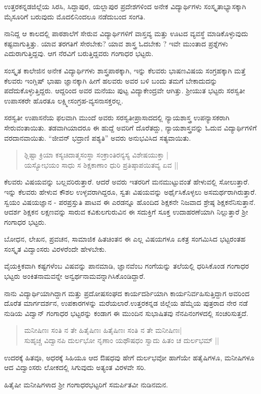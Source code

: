 ಉತ್ತರಕನ್ನಡಜಿಲ್ಲೆಯ ಸಿರಸಿ, ಸಿದ್ದಾಪುರ, ಯಲ್ಲಾಪುರ ಪ್ರದೇಶಗಳಿಂದ ಅನೇಕ ವಿದ್ಯಾರ್ಥಿಗಳು ಸಂಸ್ಕೃತಾಭ್ಯಾಸಕ್ಕಾಗಿ ಮೈಸೂರಿಗೆ ಬರುವುದು ಮೊದಲಿನಿಂದಲೂ ನಡೆದುಬಂದ ಸಂಗತಿ. 

ನಾನಿದ್ದ ಆ ಕಾಲದಲ್ಲಿ ಪಾಠಶಾಲೆಗೆ ಸೇರುವ ವಿದ್ಯಾರ್ಥಿಗಳಿಗೆ ವಾಸ್ತವ್ಯ ಮತ್ತು ಊಟದ ವ್ಯವಸ್ಥೆ ಮಾಡಿಕೊಳ್ಳುವುದು ಕಷ್ಟವಾಗುತ್ತಿತ್ತು. ಯಾವ ತರಗತಿಗೆ ಸೇರಬೇಕು? ಯಾವ ಶಾಸ್ತ್ರ ಓದಬೇಕು ? ಇವೇ ಮುಂತಾದ ಪ್ರಶ್ನೆಗಳು ಎದುರಾಗುತ್ತಿದ್ದವು. ಆಗ ನೆರವಿಗೆ ಬರುತ್ತಿದ್ದವರು ಗಂಗಾಧರ ಭಟ್ಟರು.

ಸಂಸ್ಕೃತ ಕಾಲೇಜಿನ ಅನೇಕ ವಿದ್ಯಾರ್ಥಿಗಳು ಶಾಸ್ತ್ರಪಾಠಕ್ಕಾಗಿ, ಇನ್ನು ಕೆಲವರು ಭಾಷಣವಿಷಯ ಸಂಗ್ರಹಕ್ಕಾಗಿ ಮತ್ತೆ ಕೆಲವರು ಇಂಗ್ಲಿಷ್ ಭಾಷಾ ಜ್ಞಾನಕ್ಕಾಗಿ ಹೀಗೆ ಹಲವರು ಅವರ ಬಳಿ ಬಂದು ತಮಗೆ ಬೇಕಾದುದನ್ನು ಪದೆದುಕೊಳ್ಳುತ್ತಿದ್ದರು. ಆದ್ದರಿಂದ ಅವರ ಮನೆಯು ಪುಟ್ಟ ವಿದ್ಯಾಕೇಂದ್ರವೇ ಆಗಿತ್ತು. ಶ್ರೀಯುತ ಭಟ್ಟರು ಸರಸ್ವತೀ ಉಪಾಸಕರೇ ಹೊರತೂ ಲಕ್ಷ್ಮೀಸಂಗ್ರಹ-ವ್ಯಸನಾಸಕ್ತರಲ್ಲ.

ಸರಸ್ವತೀ ಉಪಾಸನೆಯ ಫಲವಾಗಿ ಮುಂದೆ ಅವರು ಸರಸ್ವತೀಪ್ರಾಸಾದದಲ್ಲಿ ನ್ಯಾಯಶಾಸ್ತ್ರ ಉಪನ್ಯಾಸಕರಾಗಿ ಸೇರುವಂತಾಯಿತು. ತಡವಾಗಿಯಾದರೂ ಈ ಹುದ್ದೆ ಅವರಿಗೆ ದೊರೆತದ್ದು, ನ್ಯಾಯಶಾಸ್ತ್ರವನ್ನು ಓದುವ ವಿದ್ಯಾರ್ಥಿಗಳಿಗೆ ವರದಾನವಾಯಿತು. “ಜೀವನ್ ಭದ್ರಾಣಿ ಪಶ್ಯತಿ” ಅವರು ಅನುಭವಿಸಿದ ಸತ್ಯವಾಯಿತು.
\begin{verse}
ಶ್ಲಿಷ್ಟಾ ಕ್ರಿಯಾ ಕಸ್ಯಚಿದಾತ್ಮಸಂಸ್ಥಾ ಸಂಕ್ರಾಂತಿರನ್ಯಸ್ಯ ವಿಶೇಷಯುಕ್ತಾ |\\
ಯಸ್ಯೋಭಯಂ ಸಾಧು ಸ ಶಿಕ್ಷಕಾಣಾಂ ಧುರಿ ಪ್ರತಿಷ್ಠಾಪಯಿತವ್ಯ ಏವ ||
\end{verse}
ಕೆಲವರು ವಿಷಯವನ್ನು ಬಲ್ಲವರಿರುತ್ತಾರೆ. ಆದರೆ ಅವರು ಇತರರಿಗೆ ಮನಮುಟ್ಟುವಂತೆ ಹೇಳುವಲ್ಲಿ ಸೋಲುತ್ತಾರೆ. ಇನ್ನು ಕೆಲವರು ಹೇಳುವ ಕೌಶಲ ಉಳ್ಳವರಾಗಿದ್ದರೂ, ಸ್ವತಃ ವಿಷಯವನ್ನು ಅರ್ಥೈಸಿಕೊಳ್ಳಲು ಅಸಮರ್ಥರಾಗಿರುತ್ತಾರೆ. ಸ್ವಯಂ ವಿಷಯಜ್ಞಾನ - ಪರಪ್ರಸ್ತುತಿ ಪಾಟವ ಈ ಎರಡನ್ನೂ ಹೊಂದಿದ ಶಿಕ್ಷಕನೇ ನಿಜವಾದ ಶ್ರೇಷ್ಠ ಶಿಕ್ಷಕನೆನಿಸುತ್ತಾನೆ. ಆದರ್ಶ ಶಿಕ್ಷಕನ ಲಕ್ಷಣವನ್ನು ಸಾರುವ ಕವಿಕುಲಗುರುವಿನ ಈ ಸದುಕ್ತಿಗೆ ಸೂಕ್ತ ಉದಾಹರಣೆಯಾಗಿ ನಿಲ್ಲುತ್ತಾರೆ ಶ್ರೀ ಗಂಗಾಧರ ಭಟ್ಟರು.

ಬೋಧನ, ಲೇಖನ, ಪ್ರವಚನ, ಸಾಮಾಜಿಕ ಹಿತಚಿಂತನ ಈ ಎಲ್ಲ ವಿಷಯಗಳೂ ಏಕತ್ರ ಸಂಗಮಿಸಿದ ಭಟ್ಟರಂತಹ ಸಂಸ್ಕೃತ ವಿದ್ವಾಂಸರು ವಿರಳರೆಂದೇ ಹೇಳಬೇಕು. 

ವೈಯಕ್ತಿಕವಾಗಿ ಕಷ್ಟಗಳೆಂಬ ವಿಷವನ್ನು ಪಾನಮಾಡಿ, ಜ್ಞಾನವೆಂಬ ಗಂಗೆಯನ್ನು ತಲೆಯಲ್ಲಿ ಧರಿಸಿಕೊಂಡ ಗಂಗಾಧರ ಭಟ್ಟರು ಅಂಕಿತನಾಮವನ್ನೇ ಅನ್ವರ್ಥನಾಮವನ್ನಾಗಿಸಿಕೊಂಡಿದ್ದಾರೆ.

ನಾನು ವಿದ್ಯಾರ್ಥಿಯಾಗಿದ್ದಾಗ ಮತ್ತು ಪ್ರದೋಷಸಂಘದ ಕಾರ್ಯದರ್ಶಿಯಾಗಿ ಕಾರ್ಯನಿರ್ವಹಿಸುತ್ತಿದ್ದಾಗ ಅವರಿಂದ ದೊರೆತ ಮಾರ್ಗದರ್ಶನ, ಉಪಕಾರಗಳನ್ನು ಮರೆಯಲಾರೆ.ಉತ್ತರಕನ್ನಡ ಜಿಲ್ಲೆಯ ಹೆಮ್ಮೆಯ ಪುತ್ರರಾದ ನೇರ ನಡೆ ನುಡಿಯ ವಿದ್ವಾನ್ ಗಂಗಾಧರ ಭಟ್ಟರನ್ನು ಕಂಡಾಗ ಈ ಮುಂದಿನ ಸುಭಾಷಿತವು ನೆನಪಿನಂಗಳದಲ್ಲಿ ಸಂಚರಿಸುತ್ತದೆ.
\begin{verse}
ಮನೀಷಿಣಃ ಸಂತಿ ನ ತೇ ಹಿತೈಷಿಣಃ ಹಿತೈಷಿಣಃ ಸಂತಿ ನ ತೇ ಮನೀಷಿಣಃ|\\
ಸುಹೃಚ್ಚ ವಿದ್ವಾನಪಿ ದುರ್ಲಭೋ ನೃಣಾಂ ಯಥೌಷಧಂ ಸ್ವಾದು ಹಿತಂ ಚ ದುರ್ಲಭಮ್ ||
\end{verse}
ಉದರಕ್ಕೆ ಹಿತವೂ, ಅಧರಕ್ಕೆ ಸಿಹಿಯೂ ಆದ ಔಷಧವು ಹೇಗೆ ದುರ್ಲಭವೋ ಹಾಗೆಯೇ ಹತೈಷಿಗಳೂ, ಮನೀಷಿಗಳೂ ಆದ ವಿದ್ವಾಂಸರು ಲೋಕದಲ್ಲಿ ಸಿಗುವುದು ಅತ್ಯಂತ ವಿರಳವೇ ಸರಿ. 

ಹಿತೈಷೀ ಮನೀಷಿಗಳಾದ ಶ್ರೀ ಗಂಗಾಧರಭಟ್ಟರಿಗೆ ಸಮರ್ಪಿತವೀ ನುಡಿನಮನ.

